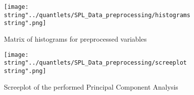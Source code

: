  
\begin{figure}[H]
  \centering
\texttt{[image: \\string"../quantlets/SPL\_Data\_preprocessing/histograms\\string".png]}
  \caption{Matrix of histograms for preprocessed variables}\label{fig:hist}
\end{figure}


\begin{figure}[H]
  \centering
\texttt{[image: \\string"../quantlets/SPL\_Data\_preprocessing/screeplot\\string".png]}
  \caption{Screeplot of the performed Principal Component Analysis}\label{fig:scree}
\end{figure}



 




